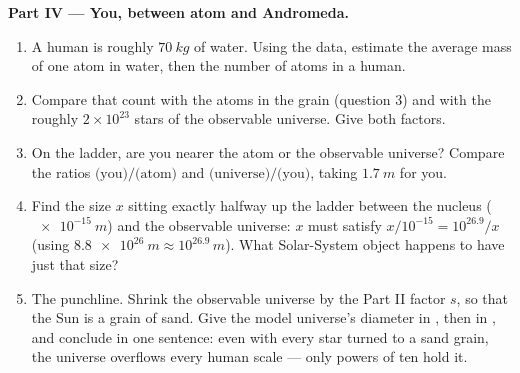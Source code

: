 \begin{problem}
\medskip
\noindent\textbf{Part IV --- You, between atom and Andromeda.}
\begin{enumerate}[resume]
  \item A human is roughly $\qty{70}{kg}$ of water. Using the data,
        estimate the average mass of one atom in water, then the
        number of atoms in a human.
  \item Compare that count with the atoms in the grain (question 3)
        and with the roughly $2\times10^{23}$ stars of the observable
        universe. Give both factors.
  \item On the ladder, are you nearer the atom or the observable
        universe? Compare the ratios $\text{(you)}/\text{(atom)}$ and
        $\text{(universe)}/\text{(you)}$, taking $\qty{1.7}{m}$ for
        you.
  \item Find the size $x$ sitting exactly halfway up the ladder
        between the nucleus ($\qty{e-15}{m}$) and the observable
        universe: $x$ must satisfy $x / 10^{-15} = 10^{26.9} / x$
        (using $\qty{8.8e26}{m} \approx 10^{26.9}\,\unit{m}$). What
        Solar-System object happens to have just that size?
  \item The punchline. Shrink the observable universe by the Part II
        factor $s$, so that the Sun is a grain of sand. Give the model
        universe's diameter in , then in , and
        conclude in one sentence: even with every star turned to a
        sand grain, the universe overflows every human scale --- only
        powers of ten hold it.
\end{enumerate}
\end{problem}
